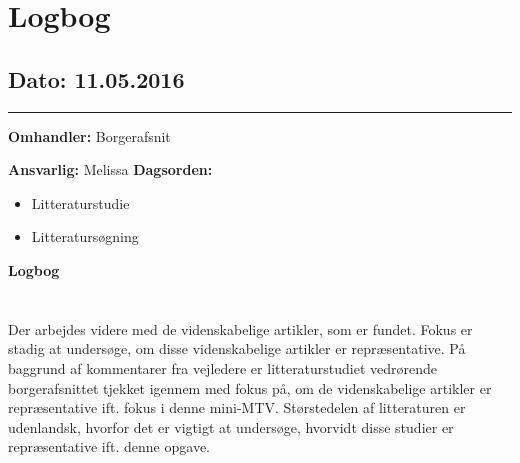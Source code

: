 \chapter{Logbog}

\section{Dato: 11.05.2016}
\hrule

\textbf{Omhandler:} Borgerafsnit 

\textbf{Ansvarlig:} Melissa
\textbf{Dagsorden:}
\begin{itemize}
	\item Litteraturstudie
	\item Litteratursøgning 
\end{itemize}

\textbf{Logbog}
\\
\\ \\
Der arbejdes videre med de videnskabelige artikler, som er fundet. Fokus er stadig at undersøge, om disse videnskabelige artikler er repræsentative. 
På baggrund af kommentarer fra vejledere er litteraturstudiet vedrørende borgerafsnittet tjekket igennem med fokus på, om de videnskabelige artikler er repræsentative ift. fokus i denne mini-MTV. Størstedelen af litteraturen er udenlandsk, hvorfor det er vigtigt at undersøge, hvorvidt disse studier er repræsentative ift. denne opgave.